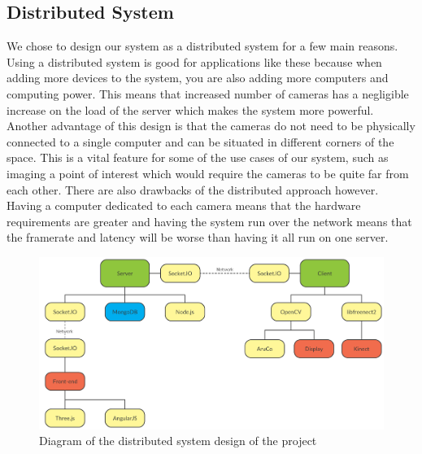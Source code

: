 \documentclass{article}
\begin{document}
\subsection{Distributed System}
We chose to design our system as a distributed system for a few main reasons. Using a distributed system is good for applications like these because when adding more devices to the system, you are also adding more computers and computing power. This means that increased number of cameras has a negligible increase on the load of the server which makes the system more powerful. Another advantage of this design is that the cameras do not need to be physically connected to a single computer and can be situated in different corners of the space. This is a vital feature for some of the use cases of our system, such as imaging a point of interest which would require the cameras to be quite far from each other. There are also drawbacks of the distributed approach however. Having a computer dedicated to each camera means that the hardware requirements are greater and having the system run over the network means that the framerate and latency will be worse than having it all run on one server.
\begin{figure}[h]
  \centering
  \includegraphics[scale=0.35]{distributed}
  \caption{Diagram of the distributed system design of the project}
\end{figure}
\newpage
\end{document}

